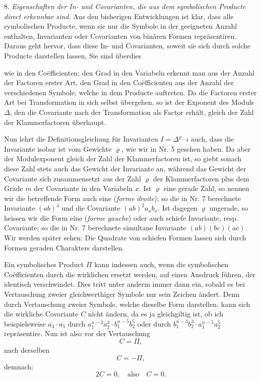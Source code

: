 8. \textit{Eigenschaften der In- und Covarianten, die aus dem
symbolischen Producte direct erkennbar sind.} Aus den bisherigen
Entwicklungen ist klar, dass alle symbolischen Producte, wenn sie
nur die Symbole in der geeigneten Anzahl enthalten, Invarianten
oder Covarianten von binären Formen repräsentiren. Daraus geht
hervor, dass diese In- und Covarianten, soweit sie sich durch
solche Producte darstellen lassen,  Sie sind
überdies 


wie in den Co\"efficienten; den Grad in den Variabeln erkennt man aus
der Anzahl der Factoren erster Art, den Grad in den Co\"efficienten
aus der Anzahl der verschiedenen Symbole, welche in dem Producte
auftreten. Da die Factoren erster Art bei Transformation in sich
selbst übergehen, so ist der Exponent des Moduls $\Delta$, den die
Covariante nach der Transformation als Factor erhält, gleich der Zahl
der Klammerfactoren überhaupt.

Nun lehrt die Definitionsgleichung für Invarianten $I = \Delta^\varrho \cdot i$
auch, dass die Invariante isobar ist vom Gewichte $\varrho$, wie wir in
Nr. 5 gesehen haben. Da aber der Modulexponent gleich der Zahl der
Klammerfactoren ist, so giebt sonach diese Zahl stets auch das Gewicht
der Invariante an, während das Gewicht der Covariante sich
zusammensetzt aus der Zahl $\varrho$ der Klammerfactoren plus dem Grade
$m$ der Covariante in den Variabeln $x$. Ist $\varrho$ eine gerade Zahl, so
nennen wir die betreffende Form auch eine  (\textit{forme droite}); so die in Nr. 7 berechnete
Invariante $(ab)^4$ und die Covariante $(ab)^2 a_x b_x$. Ist dagegen
$\varrho$ ungerade, so heissen wir die Form eine  (\textit{forme gauche}) oder auch schiefe Invariante,
resp. Covariante; so die in Nr. 7 berechnete simultane Invariante
$(ab)(bc)(ac)$. Wir werden später sehen: Die Quadrate von schiefen
Formen lassen sich durch Formen geraden Charakters darstellen.

Ein symbolisches Product $\Pi$ kann indessen auch, wenn die
symbolischen Co\"efficienten durch die wirklichen ersetzt werden, auf
einen Ausdruck führen, der identisch verschwindet. Dies tritt unter
anderm immer dann ein, sobald es bei Vertauschung zweier
gleichwerthiger Symbole nur sein Zeichen ändert. Denn durch
Vertauschung zweier Symbole, welche dieselbe Form darstellen, kann
sich die wirkliche Covariante $C$ nicht ändern, da es ja gleichgiltig
ist, ob ich beispielsweise $\overline{a_3}\cdot\overline{a_5}$ durch
$a_1^{n-3}a_2^3 \cdot b_1^{n-5}b_2^5$ oder durch
$b_1^{n-3}b_2^3 \cdot a_1^{n-5}a_2^5$ repräsentire. Nun ist also vor
der Vertauschung
\[
C = \Pi,
\]
nach derselben
\[
C = -\Pi,
\]
demnach:
\[
2C = 0, \quad \text{also} \quad C = 0.
\]

